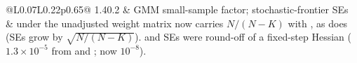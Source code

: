\begin{longtable}{@{}L{0.07\linewidth}L{0.22\linewidth}p{0.65\linewidth}@{}}
1.40.2 & GMM small-sample factor; stochastic-frontier SEs &  under the unadjusted weight matrix now carries \(N/(N-K)\) with , as  does (SEs grow by \(\sqrt{N/(N-K)}\)).  and  SEs were round-off of a fixed-step Hessian (\(1.3\times10^{-5}\) from  and ; now \(10^{-8}\)). \\
\end{longtable}
\endgroup
